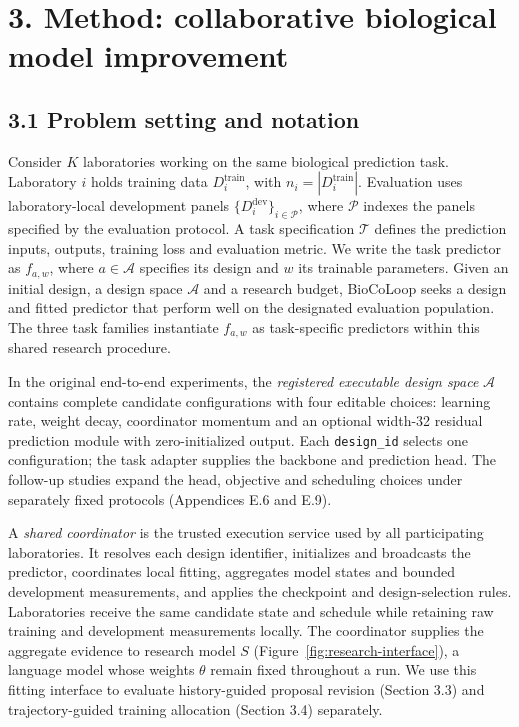 \section*{3. Method: collaborative biological model improvement}
\subsection*{3.1 Problem setting and notation}
Consider $K$ laboratories working on the same biological prediction task. Laboratory $i$ holds training data $D_i^{\mathrm{train}}$, with $n_i=|D_i^{\mathrm{train}}|$. Evaluation uses laboratory-local development panels $\{D_i^{\mathrm{dev}}\}_{i\in\mathcal P}$, where $\mathcal P$ indexes the panels specified by the evaluation protocol. A task specification $\mathcal T$ defines the prediction inputs, outputs, training loss and evaluation metric. We write the task predictor as $f_{a,w}$, where $a\in\mathcal A$ specifies its design and $w$ its trainable parameters. Given an initial design, a design space $\mathcal A$ and a research budget, BioCoLoop seeks a design and fitted predictor that perform well on the designated evaluation population. The three task families instantiate $f_{a,w}$ as task-specific predictors within this shared research procedure.

In the original end-to-end experiments, the \emph{registered executable design space} $\mathcal A$ contains complete candidate configurations with four editable choices: learning rate, weight decay, coordinator momentum and an optional width-32 residual prediction module with zero-initialized output. Each \texttt{design\_id} selects one configuration; the task adapter supplies the backbone and prediction head. The follow-up studies expand the head, objective and scheduling choices under separately fixed protocols (Appendices E.6 and E.9).

A \emph{shared coordinator} is the trusted execution service used by all participating laboratories. It resolves each design identifier, initializes and broadcasts the predictor, coordinates local fitting, aggregates model states and bounded development measurements, and applies the checkpoint and design-selection rules. Laboratories receive the same candidate state and schedule while retaining raw training and development measurements locally. The coordinator supplies the aggregate evidence to research model $S$ (Figure~\ref{fig:research-interface}), a language model whose weights $\theta$ remain fixed throughout a run. We use this fitting interface to evaluate history-guided proposal revision (Section 3.3) and trajectory-guided training allocation (Section 3.4) separately.


